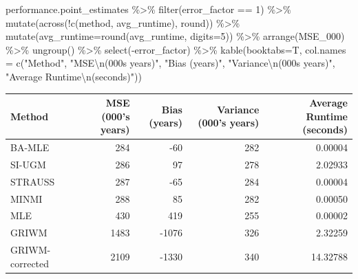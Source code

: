 \documentclass[
]{article}
\newenvironment{Shaded}{\begin{snugshade}}{\end{snugshade}}
\newcommand{\AttributeTok}[1]{\textcolor[rgb]{0.77,0.63,0.00}{#1}}
\newcommand{\DecValTok}[1]{\textcolor[rgb]{0.00,0.00,0.81}{#1}}
\newcommand{\FunctionTok}[1]{\textcolor[rgb]{0.00,0.00,0.00}{#1}}
\newcommand{\NormalTok}[1]{#1}
\newcommand{\SpecialCharTok}[1]{\textcolor[rgb]{0.00,0.00,0.00}{#1}}
\newcommand{\StringTok}[1]{\textcolor[rgb]{0.31,0.60,0.02}{#1}}
\begin{document}
\begin{Shaded}
\begin{Highlighting}[]
\NormalTok{performance.point\_estimates }\SpecialCharTok{\%\textgreater{}\%} 
  \FunctionTok{filter}\NormalTok{(error\_factor }\SpecialCharTok{==} \DecValTok{1}\NormalTok{) }\SpecialCharTok{\%\textgreater{}\%} 
  \FunctionTok{mutate}\NormalTok{(}\FunctionTok{across}\NormalTok{(}\SpecialCharTok{!}\FunctionTok{c}\NormalTok{(method, avg\_runtime), round)) }\SpecialCharTok{\%\textgreater{}\%} 
  \FunctionTok{mutate}\NormalTok{(}\AttributeTok{avg\_runtime=}\FunctionTok{round}\NormalTok{(avg\_runtime, }\AttributeTok{digits=}\DecValTok{5}\NormalTok{)) }\SpecialCharTok{\%\textgreater{}\%}
  \FunctionTok{arrange}\NormalTok{(MSE\_000) }\SpecialCharTok{\%\textgreater{}\%}
  \FunctionTok{ungroup}\NormalTok{() }\SpecialCharTok{\%\textgreater{}\%}
  \FunctionTok{select}\NormalTok{(}\SpecialCharTok{{-}}\NormalTok{error\_factor) }\SpecialCharTok{\%\textgreater{}\%}
  \FunctionTok{kable}\NormalTok{(}\AttributeTok{booktabs=}\NormalTok{T, }\AttributeTok{col.names =} \FunctionTok{c}\NormalTok{(}\StringTok{"Method"}\NormalTok{, }\StringTok{"MSE}\SpecialCharTok{\textbackslash{}n}\StringTok{(000\textquotesingle{}s years)"}\NormalTok{, }\StringTok{"Bias (years)"}\NormalTok{, }\StringTok{"Variance}\SpecialCharTok{\textbackslash{}n}\StringTok{(000\textquotesingle{}s years)"}\NormalTok{, }\StringTok{"Average Runtime}\SpecialCharTok{\textbackslash{}n}\StringTok{(seconds)"}\NormalTok{))}
\end{Highlighting}
\end{Shaded}

\begin{tabular}{lrrrr}
\toprule
Method & MSE
(000's years) & Bias (years) & Variance
(000's years) & Average Runtime
(seconds)\\
\midrule
BA-MLE & 284 & -60 & 282 & 0.00004\\
SI-UGM & 286 & 97 & 278 & 2.02933\\
STRAUSS & 287 & -65 & 284 & 0.00004\\
MINMI & 288 & 85 & 282 & 0.00050\\
MLE & 430 & 419 & 255 & 0.00002\\
\addlinespace
GRIWM & 1483 & -1076 & 326 & 2.32259\\
GRIWM-corrected & 2109 & -1330 & 340 & 14.32788\\
\bottomrule
\end{tabular}
\end{document}

